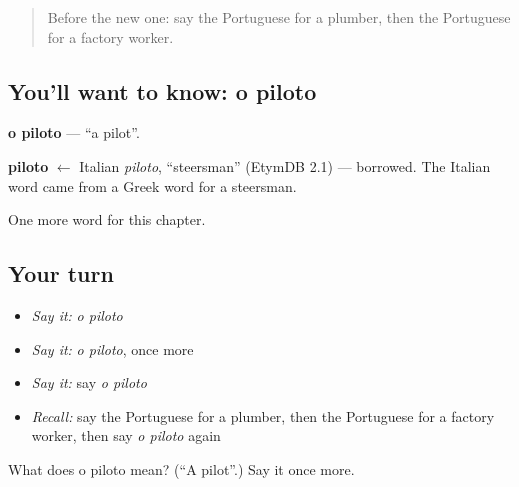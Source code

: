 \label{lesson:PT-C246-piloto}



\begin{quote}
Before the new one: say the Portuguese for a plumber, then the Portuguese for a factory worker.
\end{quote}

\subsection*{You'll want to know: o piloto}
\textbf{o piloto} — \textquotedblleft{}a pilot\textquotedblright{}.

\begin{cousinweb}
\textbf{piloto} $\leftarrow$ Italian \emph{piloto}, \textquotedblleft{}steersman\textquotedblright{} (EtymDB 2.1) — borrowed. The Italian word came from a Greek word for a steersman.
\end{cousinweb}

\begin{grammarlens}[title={What you've built}]
One more word for this chapter.
\end{grammarlens}

\subsection*{Your turn}
\begin{itemize}
\raggedright
  \item \emph{Say it:} \emph{o piloto}
  \item \emph{Say it:} \emph{o piloto}, once more
  \item \emph{Say it:} say \emph{o piloto}
  \item \emph{Recall:} say the Portuguese for a plumber, then the Portuguese for a factory worker, then say \emph{o piloto} again
\end{itemize}

\begin{tcolorbox}[breakable,colback=teal!4,colframe=teal!35!black,title={Before you move on}]
What does o piloto mean? (\textquotedblleft{}A pilot\textquotedblright{}.) Say it once more.
\end{tcolorbox}
